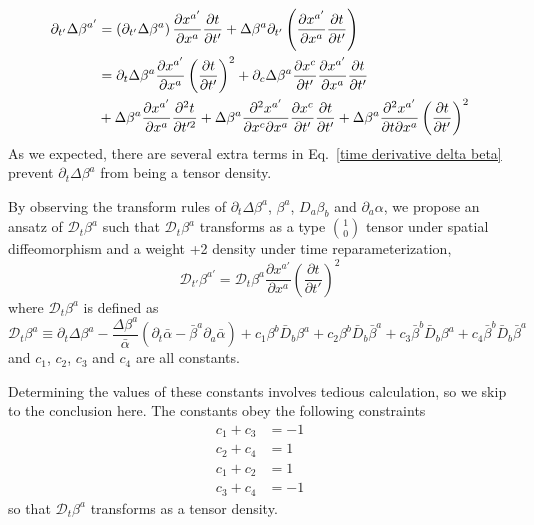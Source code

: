 \documentclass[letterpaper,nofootinbib,prd,amsmath,onecolumn]{revtex4-1}
\begin{document}
\begin{align}\label{time derivative delta beta} 
\partial_{t'}\Delta \beta^{a'} & = \left(\partial_{t'}\Delta \beta^{a}\right)\frac{\partial x^{a'}}{\partial x^{a}}\frac{\partial t}{\partial t'} + \Delta \beta^{a}\partial_{t'}\left(\frac{\partial x^{a'}}{\partial x^{a}}\frac{\partial t}{\partial t'}\right)\notag\\
& = \partial_{t}\Delta \beta^{a}\frac{\partial x^{a'}}{\partial x^{a}}\left(\frac{\partial t}{\partial t'}\right)^{2} + \partial_{c}\Delta \beta^{a}\frac{\partial x^{c}}{\partial t'}\frac{\partial x^{a'}}{\partial x^{a}}\frac{\partial t}{\partial t'}\notag\\
& + \Delta \beta^{a}\frac{\partial x^{a'}}{\partial x^{a}}\frac{\partial^{2}t}{\partial t'^{2}} + \Delta \beta^{a}\frac{\partial^{2} x^{a'}}{\partial x^{c}\partial x^{a}}\frac{\partial x^{c}}{\partial t'}\frac{\partial t}{\partial t'} + \Delta \beta^{a}\frac{\partial^{2}x^{a'}}{\partial t\partial x^{a}}\left(\frac{\partial t}{\partial t'}\right)^{2}
\end{align}
As we expected, there are several extra terms in Eq.~\ref{time derivative delta beta} prevent $\partial_{t}\Delta\beta^{a}$ from being a tensor density. 

By observing the transform rules of $\partial_{t}\Delta\beta^{a}$, $\beta^{a}$, $D_{a}\beta_{b}$ and $\partial_{a}\alpha$, we propose an ansatz of $\mathscr{D}_{t}\beta^{a}$ such that $\mathscr{D}_{t}\beta^{a}$ transforms as a type $1 \choose 0$ tensor under spatial diffeomorphism and a weight +2 density under time reparameterization, 
\begin{equation}
\mathscr{D}_{t'}\beta^{a'} = \mathscr{D}_{t}\beta^{a}\frac{\partial x^{a'}}{\partial x^{a}}\left(\frac{\partial t}{\partial t'}\right)^{2}
\end{equation}
where $\mathscr{D}_{t}\beta^{a}$ is defined as
\begin{equation}
\mathscr{D}_{t}\beta^{a} \equiv \partial_{t}\Delta \beta^{a} - \frac{\Delta \beta^{a}}{{\bar \alpha}}(\partial_{t}{\bar \alpha} - {\bar \beta}^{a}\partial_{a}{\bar \alpha}) + c_{1}\beta^{b}{\bar D}_{b}\beta^{a} + c_{2}\beta^{b}{\bar D}_{b}{\bar \beta}^{a} + c_{3}{\bar \beta}^{b}{\bar D}_{b}\beta^{a} + c_{4}{\bar \beta}^{b}{\bar D}_{b}{\bar \beta}^{a}
\end{equation}
and $c_{1}$, $c_{2}$, $c_{3}$ and $c_{4}$ are all constants. 

Determining the values of these constants involves tedious calculation, so we skip to the conclusion here. The constants obey the following constraints
\begin{align*}
c_{1} + c_{3} & = -1\\
c_{2} + c_{4} & = 1\\
c_{1} + c_{2} & = 1\\
c_{3} + c_{4} & = -1 
\end{align*}
so that $\mathscr{D}_{t} \beta^{a}$ transforms as a tensor density. 
\end{document}
